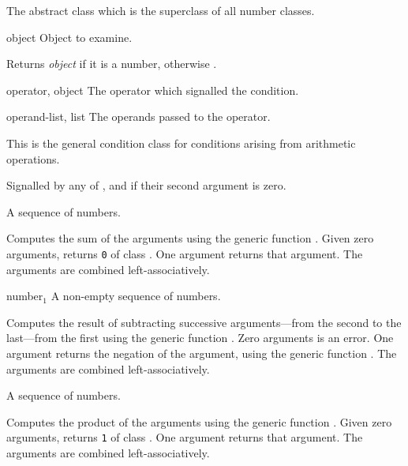 \begin{optDefinition}
%
The abstract class which is the superclass of all number classes.

%
\begin{arguments}
    \item[object] Object to examine.
\end{arguments}
%
\result%
Returns {\em object\/} if it is a number, otherwise \nil{}.


\begin{initoptions}
    \item[operator, object] The operator which signalled the condition.
    \item[operand-list, list] The operands passed to the operator.
\end{initoptions}
%
\remarks%
This is the general condition class for conditions arising from arithmetic
operations.

%
Signalled by any of ,
 and  if
their second argument is zero.

\function{+}
%
\begin{arguments}
    \item[{\optional{number$_1$ number$_2$ ...}}] A sequence of numbers.
\end{arguments}
%
\result%
Computes the sum of the arguments using the generic function
.  Given zero arguments, \functionref{+} returns {\tt 0} of
class .  One argument returns that argument.  The arguments
are combined left-associatively.

\function{-}
%
\begin{arguments}
    \item[{number$_1$ \optional{number$_2$ ...}}] A non-empty sequence of
    numbers.
\end{arguments}
%
\result%
Computes the result of subtracting successive arguments---from the second to the
last---from the first using the generic function .  Zero
arguments is an error.  One argument returns the negation of the argument, using
the generic function .  The arguments are combined
left-associatively.

\function{*}
%
\begin{arguments}
    \item[{\optional{number$_1$ number$_2$ ...}}] A sequence of numbers.
\end{arguments}
%
\result%
Computes the product of the arguments using the generic function
.  Given zero arguments, \functionref{*} returns {\tt 1} of
class .  One argument returns that argument.  The arguments
are combined left-associatively.


\end{optDefinition}
